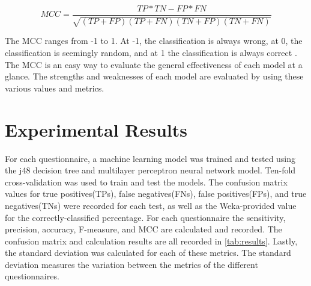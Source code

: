 \documentclass[10pt,conference,a4paper]{IEEEtran}
\begin{document}
\begin{equation}
MCC=\frac{TP*TN-FP*FN}{\sqrt{(TP+FP)(TP+FN)(TN+FP)(TN+FN)}}
\end{equation}

The MCC ranges from -1 to 1. At -1, the classification is always wrong, at 0, the classification is seemingly random, and at 1 the classification is always correct \cite{Lever2016}. The MCC is an easy way to evaluate the general effectiveness of each model at a glance. The strengths and weaknesses of each model are evaluated by using these various values and metrics. \par




\section{Experimental Results}



For each questionnaire, a machine learning model was trained and tested using the j48 decision tree and multilayer perceptron neural network model. Ten-fold cross-validation was used to train and test the models. The confusion matrix values for true positives(TPs), false negatives(FNs), false positives(FPs), and true negatives(TNs) were recorded for each test, as well as the Weka-provided value for the correctly-classified percentage. For each questionnaire the sensitivity, precision, accuracy, F-measure, and MCC are calculated and recorded. The confusion matrix and calculation results are all recorded in \autoref{tab:results}. Lastly, the standard deviation was calculated for each of these metrics. The standard deviation measures the variation between the metrics of the different questionnaires.\par
\end{document}
